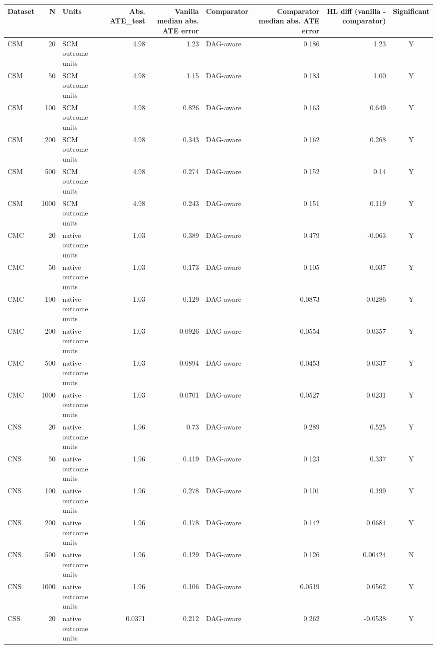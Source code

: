 \begin{tabular}{lrlrrlrrc}
\toprule
Dataset & N & Units & Abs. ATE\_test & Vanilla median abs. ATE error & Comparator & Comparator median abs. ATE error & HL diff (vanilla - comparator) & Significant \\
\midrule
CSM & 20 & SCM outcome units & 4.98 & 1.23 & DAG-aware & 0.186 & 1.23 & Y \\
CSM & 50 & SCM outcome units & 4.98 & 1.15 & DAG-aware & 0.183 & 1.00 & Y \\
CSM & 100 & SCM outcome units & 4.98 & 0.826 & DAG-aware & 0.163 & 0.649 & Y \\
CSM & 200 & SCM outcome units & 4.98 & 0.343 & DAG-aware & 0.162 & 0.268 & Y \\
CSM & 500 & SCM outcome units & 4.98 & 0.274 & DAG-aware & 0.152 & 0.14 & Y \\
CSM & 1000 & SCM outcome units & 4.98 & 0.243 & DAG-aware & 0.151 & 0.119 & Y \\
CMC & 20 & native outcome units & 1.03 & 0.389 & DAG-aware & 0.479 & -0.063 & Y \\
CMC & 50 & native outcome units & 1.03 & 0.173 & DAG-aware & 0.105 & 0.037 & Y \\
CMC & 100 & native outcome units & 1.03 & 0.129 & DAG-aware & 0.0873 & 0.0286 & Y \\
CMC & 200 & native outcome units & 1.03 & 0.0926 & DAG-aware & 0.0554 & 0.0357 & Y \\
CMC & 500 & native outcome units & 1.03 & 0.0894 & DAG-aware & 0.0453 & 0.0337 & Y \\
CMC & 1000 & native outcome units & 1.03 & 0.0701 & DAG-aware & 0.0527 & 0.0231 & Y \\
CNS & 20 & native outcome units & 1.96 & 0.73 & DAG-aware & 0.289 & 0.525 & Y \\
CNS & 50 & native outcome units & 1.96 & 0.419 & DAG-aware & 0.123 & 0.337 & Y \\
CNS & 100 & native outcome units & 1.96 & 0.278 & DAG-aware & 0.101 & 0.199 & Y \\
CNS & 200 & native outcome units & 1.96 & 0.178 & DAG-aware & 0.142 & 0.0684 & Y \\
CNS & 500 & native outcome units & 1.96 & 0.129 & DAG-aware & 0.126 & 0.00424 & N \\
CNS & 1000 & native outcome units & 1.96 & 0.106 & DAG-aware & 0.0519 & 0.0562 & Y \\
CSS & 20 & native outcome units & 0.0371 & 0.212 & DAG-aware & 0.262 & -0.0538 & Y \\

\end{tabular}
